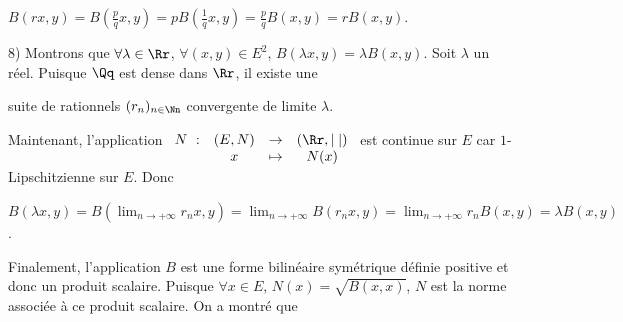 {{\begin{center}
$B(rx,y) = B\left(\frac{p}{q}x,y\right) =pB\left(\frac{1}{q}x,y\right)=\frac{p}{q}B(x,y) = rB(x,y)$.
\end{center}

8) Montrons que $\forall\lambda\in\Rr$, $\forall(x,y)\in E^2$, $B(\lambda x,y) =\lambda B(x,y)$. Soit $\lambda$ un réel. Puisque $\Qq$ est dense dans $\Rr$, il existe une

suite de rationnels $(r_n)_{n\in\Nn}$ convergente de limite $\lambda$.

Maintenant, l'application $\begin{array}[t]{cccc}N~:&(E,N)&\rightarrow&(\Rr,|\;|)\\
 &x&\mapsto&N(x)
 \end{array}$ est continue sur $E$ car $1$-Lipschitzienne sur $E$. Donc
 
\begin{center}
$B(\lambda x,y) =B(\lim_{n \rightarrow +\infty}r_nx,y)=\lim_{n \rightarrow +\infty}B(r_nx,y)=\lim_{n \rightarrow +\infty}r_nB(x,y)=\lambda B(x,y)$.
\end{center}

Finalement, l'application $B$ est une forme bilinéaire symétrique définie positive et donc un produit scalaire. Puisque $\forall x\in E$, $N(x)=\sqrt{B(x,x)}$, $N$ est la norme associée à ce produit scalaire. On a montré que

\begin{center}
\end{center}
}
}
